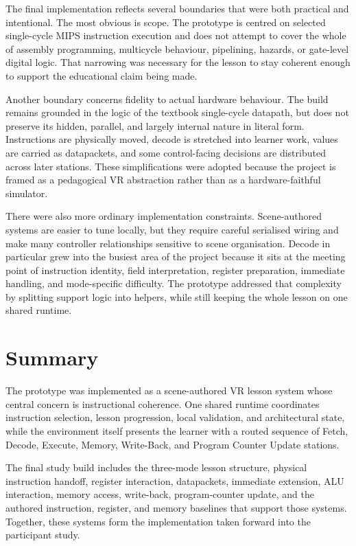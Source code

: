 The final implementation reflects several boundaries that were both practical and intentional. The most obvious is scope. The prototype is centred on selected single-cycle MIPS instruction execution and does not attempt to cover the whole of assembly programming, multicycle behaviour, pipelining, hazards, or gate-level digital logic. That narrowing was necessary for the lesson to stay coherent enough to support the educational claim being made.

Another boundary concerns fidelity to actual hardware behaviour. The build remains grounded in the logic of the textbook single-cycle datapath, but does not preserve its hidden, parallel, and largely internal nature in literal form. Instructions are physically moved, decode is stretched into learner work, values are carried as datapackets, and some control-facing decisions are distributed across later stations. These simplifications were adopted because the project is framed as a pedagogical VR abstraction rather than as a hardware-faithful simulator.

There were also more ordinary implementation constraints. Scene-authored systems are easier to tune locally, but they require careful serialised wiring and make many controller relationships sensitive to scene organisation. Decode in particular grew into the busiest area of the project because it sits at the meeting point of instruction identity, field interpretation, register preparation, immediate handling, and mode-specific difficulty. The prototype addressed that complexity by splitting support logic into helpers, while still keeping the whole lesson on one shared runtime.

\section{Summary}

The prototype was implemented as a scene-authored VR lesson system whose central concern is instructional coherence. One shared runtime coordinates instruction selection, lesson progression, local validation, and architectural state, while the environment itself presents the learner with a routed sequence of Fetch, Decode, Execute, Memory, Write-Back, and Program Counter Update stations.

The final study build includes the three-mode lesson structure, physical instruction handoff, register interaction, datapackets, immediate extension, ALU interaction, memory access, write-back, program-counter update, and the authored instruction, register, and memory baselines that support those systems. Together, these systems form the implementation taken forward into the participant study.
